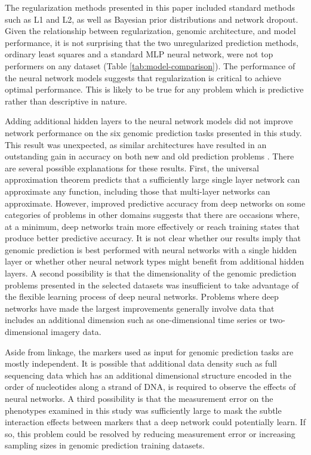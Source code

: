 The regularization methods presented in this paper included standard methods such 
as L1 and L2, as well as Bayesian prior distributions and network dropout. 
Given the relationship between regularization, genomic architecture, and model 
performance, it is not surprising that the two unregularized prediction methods, 
ordinary least squares and a standard MLP neural network, were not top performers 
on any dataset (Table \ref{tab:model-comparison}). The performance of the neural 
network models suggests that regularization is critical to achieve optimal 
performance. This is likely to be true for any problem which is predictive rather 
than descriptive in nature.

Adding additional hidden layers to the neural network models did not improve
network performance on the six genomic prediction tasks presented in this study.
This result was unexpected, as similar architectures have resulted in an outstanding 
gain in accuracy on both new and old prediction problems \citep{mnih2013, subasi2005, lang1990}.
There are several possible explanations for these results. First, the universal
approximation theorem predicts that a sufficiently large single layer network
can approximate any function, including those that multi-layer networks can approximate.
However, improved predictive accuracy from deep networks on some categories of problems
in other domains suggests that there are occasions where, 
at a minimum, deep networks train more effectively or reach training states that 
produce better predictive accuracy. It is not clear whether our results imply that
genomic prediction is best performed with neural networks with a single hidden 
layer or whether other neural network types might benefit from additional hidden layers.
A second possibility is that the dimensionality of the genomic prediction problems
presented in the selected datasets was insufficient to take advantage of the
flexible learning process of deep neural networks. Problems where deep networks have
made the largest improvements generally involve data that includes an additional dimension
such as one-dimensional time series or two-dimensional imagery data. 

Aside from linkage, the markers used as input for genomic prediction 
tasks are mostly independent. It is possible that additional data density 
such as full sequencing data which has an additional dimensional 
structure encoded in the order of nucleotides along a strand of 
DNA, is required to observe the effects of neural networks. A third possibility is that 
the measurement error on the phenotypes examined in this study was sufficiently 
large to mask the subtle interaction effects between markers that a deep 
network could potentially learn. If so, this problem could be resolved by reducing 
measurement error or increasing sampling sizes in genomic prediction training datasets.  

